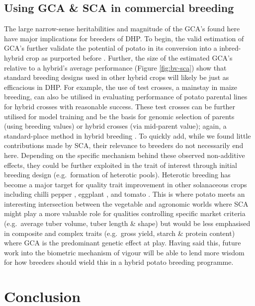 \subsection{Using GCA \& SCA in commercial breeding}\label{using-gca-sca-in-commercial-breeding}

The large narrow-sense heritabilities and magnitude of the GCA's found here have major implications for breeders of DHP. To begin, the valid estimation of GCA's further validate the potential of potato in its conversion into a inbred-hybrid crop as purported before \parencite{Jansky2016, Lindhout2011}. Further, the size of the estimated GCA's relative to a hybrid's average performance (Figure \ref{fig:bv-sca}) show that standard breeding designs used in other hybrid crops will likely be just as efficacious in DHP. For example, the use of test crosses, a mainstay in maize breeding, can also be utilised in evaluating performance of potato parental lines for hybrid crosses with reasonable success. These test crosses can be further utilised for model training and be the basis for genomic selection of parents (using breeding values) or hybrid crosses (via mid-parent value); again, a standard-place method in hybrid breeding \parencite{Albrecht2011}. To quickly add, while we found little contributions made by SCA, their relevance to breeders do not necessarily end here. Depending on the specific mechanism behind these observed non-additive effects, they could be further exploited in the trait of interest through initial breeding design (e.g.~formation of heterotic pools). Heterotic breeding has become a major target for quality trait improvement in other solanaceous crops including chilli pepper \parencite{Herath2020}, eggplant \parencite{Kumar2020}, and tomato \parencite{Pearson1983}. This is where potato meets an interesting intersection between the vegetable and agronomic worlds where SCA might play a more valuable role for qualities controlling specific market criteria (e.g.~average tuber volume, tuber length \& shape) but would be less emphasised in composite and complex traits (e.g.~gross yield, starch \& protein content) where GCA is the predominant genetic effect at play. Having said this, future work into the biometric mechanism of vigour will be able to lend more wisdom for how breeders should wield this in a hybrid potato breeding programme.



\section{Conclusion}\label{conclusion}

